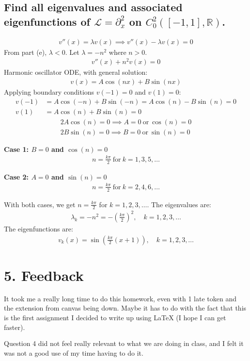 \documentclass[11pt]{article}
\begin{document}
    \subsection{Find all eigenvalues and associated eigenfunctions of $\mathcal{L}=\partial_{x}^2$ on $C_0^2([-1,1],\mathbb{R})$.}
    \begin{gather*}
        v''(x) = \lambda v(x) \implies v''(x) - \lambda v(x) = 0
    \end{gather*}
    From part (e), $\lambda < 0$. Let $\lambda = -n^2$ where $n > 0$.
    \begin{gather*}
        v''(x) + n^2 v(x) = 0
    \end{gather*}
    Harmonic oscillator ODE, with general solution:
    \begin{gather*}
        v(x) = A\cos(nx) + B\sin(nx)
    \end{gather*}
    Applying boundary conditions $v(-1) = 0$ and $v(1) = 0$:
    \begin{align*}
        v(-1) &= A\cos(-n) + B\sin(-n) = A\cos(n) - B\sin(n) = 0 \\
        v(1) &= A\cos(n) + B\sin(n) = 0
    \end{align*}
    \begin{gather*}
        2A\cos(n) = 0 \implies A=0 \ \text{or} \ \cos(n)=0 \\
        2B\sin(n) = 0 \implies B=0 \ \text{or} \ \sin(n)=0
    \end{gather*}

    \textbf{Case 1: $B=0$ and $\cos(n)=0$}
    \begin{gather*}
        n = \frac{k\pi}{2} \ \text{for} \ k=1,3,5,\dots
    \end{gather*}

    \textbf{Case 2: $A=0$ and $\sin(n)=0$}
    \begin{gather*}
        n = \frac{k\pi}{2} \ \text{for} \ k=2,4,6,\dots
    \end{gather*}

    With both cases, we get $n = \frac{k\pi}{2}$ for $k=1,2,3,\dots$.
    The eigenvalues are:
    \begin{gather*}
        \lambda_k = -n^2 = -\left(\frac{k\pi}{2}\right)^2, \quad k=1,2,3,\dots
    \end{gather*}
    The eigenfunctions are:
    \begin{gather*}
        v_k(x) = \sin\left(\frac{k\pi}{2}(x+1)\right), \quad k=1,2,3,\dots
    \end{gather*}
    \newpage
    \section*{5. Feedback}

    It took me a really long time to do this homework, even with 1 late token and the extension
    from canvas being down.
    Maybe it has to do with the fact that this is the first assignment I
    decided to write up using LaTeX (I hope I can get faster).

    Question 4 did not feel really relevant to what we are doing in class, and I felt it was not a
    good use of my time having to do it.
\end{document}
